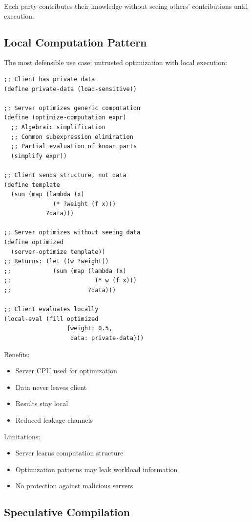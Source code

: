 \documentclass[10pt]{article}
\begin{document}
Each party contributes their knowledge without seeing others' contributions until execution.

\subsection{Local Computation Pattern}

The most defensible use case: untrusted optimization with local execution:

\begin{lstlisting}
;; Client has private data
(define private-data (load-sensitive))

;; Server optimizes generic computation
(define (optimize-computation expr)
  ;; Algebraic simplification
  ;; Common subexpression elimination
  ;; Partial evaluation of known parts
  (simplify expr))

;; Client sends structure, not data
(define template
  (sum (map (lambda (x)
              (* ?weight (f x)))
            ?data)))

;; Server optimizes without seeing data
(define optimized
  (server-optimize template))
;; Returns: (let ((w ?weight))
;;            (sum (map (lambda (x)
;;                        (* w (f x)))
;;                      ?data)))

;; Client evaluates locally
(local-eval (fill optimized
                  {weight: 0.5,
                   data: private-data}))
\end{lstlisting}

Benefits:
\begin{itemize}
\item Server CPU used for optimization
\item Data never leaves client
\item Results stay local
\item Reduced leakage channels
\end{itemize}

Limitations:
\begin{itemize}
\item Server learns computation structure
\item Optimization patterns may leak workload information
\item No protection against malicious servers
\end{itemize}

\subsection{Speculative Compilation}
\end{document}
